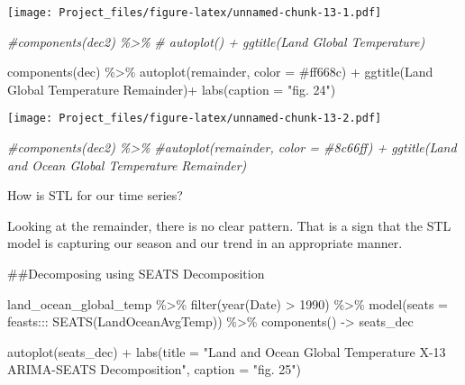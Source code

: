 \documentclass[
]{article}
\newenvironment{Shaded}{\begin{snugshade}}{\end{snugshade}}
\newcommand{\AttributeTok}[1]{\textcolor[rgb]{0.77,0.63,0.00}{#1}}
\newcommand{\CommentTok}[1]{\textcolor[rgb]{0.56,0.35,0.01}{\textit{#1}}}
\newcommand{\DecValTok}[1]{\textcolor[rgb]{0.00,0.00,0.81}{#1}}
\newcommand{\FunctionTok}[1]{\textcolor[rgb]{0.00,0.00,0.00}{#1}}
\newcommand{\NormalTok}[1]{#1}
\newcommand{\OtherTok}[1]{\textcolor[rgb]{0.56,0.35,0.01}{#1}}
\newcommand{\SpecialCharTok}[1]{\textcolor[rgb]{0.00,0.00,0.00}{#1}}
\newcommand{\StringTok}[1]{\textcolor[rgb]{0.31,0.60,0.02}{#1}}
\begin{document}
\texttt{[image: Project\_files/figure-latex/unnamed-chunk-13-1.pdf]}

\begin{Shaded}
\begin{Highlighting}[]
\CommentTok{\#components(dec2) \%\textgreater{}\%}
\CommentTok{\#  autoplot() + ggtitle(\textquotesingle{}Land Global Temperature\textquotesingle{}) }

\FunctionTok{components}\NormalTok{(dec) }\SpecialCharTok{\%\textgreater{}\%}
  \FunctionTok{autoplot}\NormalTok{(remainder, }\AttributeTok{color =} \StringTok{\textquotesingle{}\#ff668c\textquotesingle{}}\NormalTok{) }\SpecialCharTok{+} \FunctionTok{ggtitle}\NormalTok{(}\StringTok{\textquotesingle{}Land Global Temperature Remainder\textquotesingle{}}\NormalTok{)}\SpecialCharTok{+}
  \FunctionTok{labs}\NormalTok{(}\AttributeTok{caption =} \StringTok{"fig. 24"}\NormalTok{) }
\end{Highlighting}
\end{Shaded}

\texttt{[image: Project\_files/figure-latex/unnamed-chunk-13-2.pdf]}

\begin{Shaded}
\begin{Highlighting}[]
\CommentTok{\#components(dec2) \%\textgreater{}\%}
\CommentTok{\#autoplot(remainder, color = \textquotesingle{}\#8c66ff\textquotesingle{}) + ggtitle(\textquotesingle{}Land and Ocean Global Temperature Remainder\textquotesingle{}) }
\end{Highlighting}
\end{Shaded}

How is STL for our time series?

Looking at the remainder, there is no clear pattern. That is a sign that
the STL model is capturing our season and our trend in an appropriate
manner.

\#\#Decomposing using SEATS Decomposition

\begin{Shaded}
\begin{Highlighting}[]
\NormalTok{land\_ocean\_global\_temp }\SpecialCharTok{\%\textgreater{}\%} 
  \FunctionTok{filter}\NormalTok{(}\FunctionTok{year}\NormalTok{(Date) }\SpecialCharTok{\textgreater{}} \DecValTok{1990}\NormalTok{) }\SpecialCharTok{\%\textgreater{}\%}
  \FunctionTok{model}\NormalTok{(}\AttributeTok{seats =}\NormalTok{ feasts}\SpecialCharTok{:::} \FunctionTok{SEATS}\NormalTok{(LandOceanAvgTemp)) }\SpecialCharTok{\%\textgreater{}\%}
  \FunctionTok{components}\NormalTok{() }\OtherTok{{-}\textgreater{}}\NormalTok{ seats\_dec}

\FunctionTok{autoplot}\NormalTok{(seats\_dec) }\SpecialCharTok{+} \FunctionTok{labs}\NormalTok{(}\AttributeTok{title =} \StringTok{"Land and Ocean Global Temperature X{-}13 ARIMA{-}SEATS Decomposition"}\NormalTok{, }\AttributeTok{caption =} \StringTok{"fig. 25"}\NormalTok{)}
\end{Highlighting}
\end{Shaded}
\end{document}
